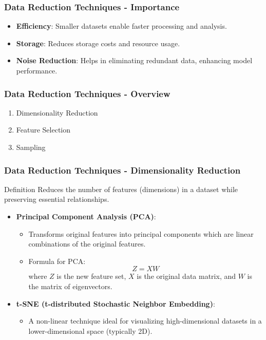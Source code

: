 \documentclass[aspectratio=169]{beamer}
\begin{document}
\begin{frame}[fragile]
    \frametitle{Data Reduction Techniques - Importance}
    \begin{itemize}
        \item \textbf{Efficiency}: Smaller datasets enable faster processing and analysis.
        \item \textbf{Storage}: Reduces storage costs and resource usage.
        \item \textbf{Noise Reduction}: Helps in eliminating redundant data, enhancing model performance.
    \end{itemize}
\end{frame}

\begin{frame}[fragile]
    \frametitle{Data Reduction Techniques - Overview}
    \begin{enumerate}
        \item Dimensionality Reduction
        \item Feature Selection
        \item Sampling
    \end{enumerate}
\end{frame}

\begin{frame}[fragile]
    \frametitle{Data Reduction Techniques - Dimensionality Reduction}
    \begin{block}{Definition}
        Reduces the number of features (dimensions) in a dataset while preserving essential relationships.
    \end{block}
    \begin{itemize}
        \item \textbf{Principal Component Analysis (PCA)}:
            \begin{itemize}
                \item Transforms original features into principal components which are linear combinations of the original features.
                \item Formula for PCA:
                \begin{equation}
                    Z = XW
                \end{equation}
                where \( Z \) is the new feature set, \( X \) is the original data matrix, and \( W \) is the matrix of eigenvectors.
            \end{itemize}
        \item \textbf{t-SNE (t-distributed Stochastic Neighbor Embedding)}:
            \begin{itemize}
                \item A non-linear technique ideal for visualizing high-dimensional datasets in a lower-dimensional space (typically 2D).
            \end{itemize}
    \end{itemize}
\end{frame}
\end{document}
